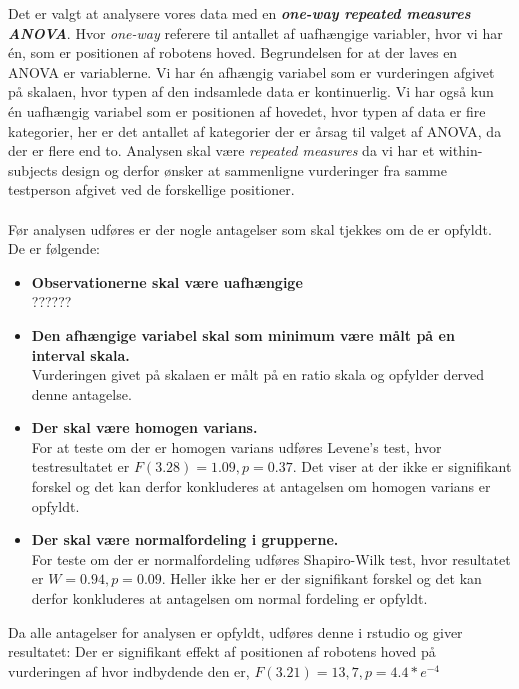 \noindent Det er valgt at analysere vores data med en \textbf{\textit{one-way repeated measures ANOVA}}. Hvor \textit{one-way} referere til antallet af uafhængige variabler, hvor vi har én, som er positionen af robotens hoved. 
Begrundelsen for at der laves en ANOVA er variablerne. Vi har én afhængig variabel som er vurderingen afgivet på skalaen, hvor typen af den indsamlede data er kontinuerlig. Vi har også kun én uafhængig variabel som er positionen af hovedet, hvor typen af data er fire kategorier, her er det antallet af kategorier der er årsag til valget af ANOVA, da der er flere end to. 
Analysen skal være \textit{repeated measures} da vi har et within-subjects design og derfor ønsker at sammenligne vurderinger fra samme testperson afgivet ved de forskellige positioner. 
\\\\
Før analysen udføres er der nogle antagelser som skal tjekkes om de er opfyldt. De er følgende: 
\begin{itemize}
	\item \textbf{Observationerne skal være uafhængige}\\
	?????? 
	\item \textbf{Den afhængige variabel skal som minimum være målt på en interval skala.}\\
	Vurderingen givet på skalaen er målt på en ratio skala og opfylder derved denne antagelse.
	\item \textbf{Der skal være homogen varians. }\\
	For at teste om der er homogen varians udføres Levene's test, hvor testresultatet er $F(3.28)=1.09, p=0.37$. Det viser at der ikke er signifikant forskel og det kan derfor konkluderes at antagelsen om homogen varians er opfyldt. 
	\item \textbf{Der skal være normalfordeling i grupperne.}\\
	For teste om der er normalfordeling udføres Shapiro-Wilk test, hvor resultatet er $W=0.94, p=0.09$. Heller ikke her er der signifikant forskel og det kan derfor konkluderes at antagelsen om normal fordeling er opfyldt.
\end{itemize}

\noindent Da alle antagelser for analysen er opfyldt, udføres denne i rstudio og giver resultatet: 
Der er signifikant effekt af positionen af robotens hoved på vurderingen af hvor indbydende den er, $F(3.21)=13,7, p=4.4*e^{-4}$

